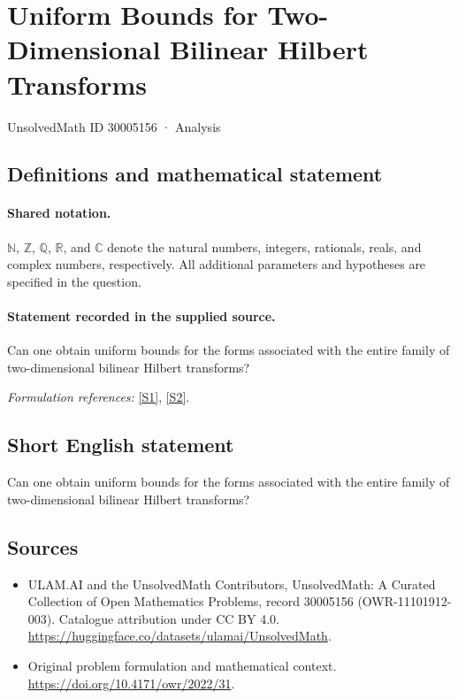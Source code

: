 \documentclass[11pt]{article}
\newcommand{\sref}[2]{\hyperlink{source:#1:#2}{[S#2]}}
\begin{document}
\setcounter{section}{30005155}
\section{Uniform Bounds for Two-Dimensional Bilinear Hilbert Transforms}\label{30005156}
{\small UnsolvedMath ID 30005156 · Analysis}
\subsection{Definitions and mathematical statement}

\paragraph{Shared notation.}$\mathbb N$, $\mathbb Z$, $\mathbb Q$, $\mathbb R$, and $\mathbb C$ denote the natural numbers, integers, rationals, reals, and complex numbers, respectively. All additional parameters and hypotheses are specified in the question.


\paragraph{Statement recorded in the supplied source.}
Can one obtain uniform bounds for the forms associated with the entire family of two-dimensional bilinear Hilbert transforms?
\par\smallskip\textit{Formulation references:} \sref{30005156}{1}, \sref{30005156}{2}.
\subsection{Short English statement}
Can one obtain uniform bounds for the forms associated with the entire family of two-dimensional bilinear Hilbert transforms?
\subsection{Sources}
\begin{itemize}
\item[\hypertarget{source:30005156:1}{S1}] ULAM.AI and the UnsolvedMath Contributors, UnsolvedMath: A Curated Collection of Open Mathematics Problems, record 30005156 (OWR-11101912-003). Catalogue attribution under CC BY 4.0.
\url{https://huggingface.co/datasets/ulamai/UnsolvedMath}.
\item[\hypertarget{source:30005156:2}{S2}] Original problem formulation and mathematical context.
\url{https://doi.org/10.4171/owr/2022/31}.
\end{itemize}
\label{end:30005156}
\end{document}
